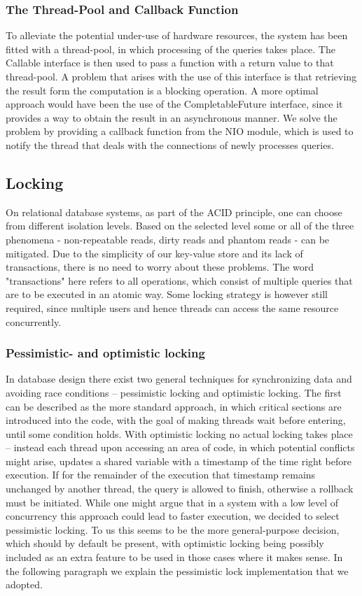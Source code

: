 \documentclass[a4paper, twocolumn,11pt]{article}
\begin{document}
\subsubsection{The Thread-Pool and Callback Function}
To alleviate the potential under-use of hardware resources, the system has been fitted with a thread-pool, in which processing of the queries takes place. The Callable interface is then used to pass a function with a return value to that thread-pool. A problem that arises with the use of this interface is that retrieving the result form the computation is a blocking operation. A more optimal approach would have been the use of the CompletableFuture interface, since it provides a way to obtain the result in an asynchronous manner. We solve the problem by providing a callback function from the NIO module, which is used to notify the thread that deals with the connections of newly processes queries.

\subsection{Locking}
On relational database systems, as part of the ACID principle, one can choose from different isolation levels. Based on the selected level some or all of the three phenomena - non-repeatable reads, dirty reads and phantom reads - can be mitigated. Due to the simplicity of our key-value store and its lack of transactions, there is no need to worry about these problems. The word "transactions" here refers to all operations, which consist of multiple queries that are to be executed in an atomic way. Some locking strategy is however still required, since multiple users and hence threads can access the same resource concurrently.

\subsubsection{Pessimistic- and optimistic locking}
In database design there exist two general techniques for synchronizing data and avoiding race conditions – pessimistic locking and optimistic locking. The first can be described as the more standard approach, in which critical sections are introduced into the code, with the goal of making threads wait before entering, until some condition holds. With optimistic locking no actual locking takes place – instead each thread upon accessing an area of code, in which potential conflicts might arise, updates a shared variable with a timestamp of the time right before execution. If for the remainder of the execution that timestamp remains unchanged by another thread, the query is allowed to finish, otherwise a rollback must be initiated. While one might argue that in a system with a low level of concurrency this approach could lead to faster execution, we decided to select pessimistic locking. To us this seems to be the more general-purpose decision, which should by default be present, with optimistic locking being possibly included as an extra feature to be used in those cases where it makes sense. In the following paragraph we explain the pessimistic lock implementation that we adopted.
\end{document}

